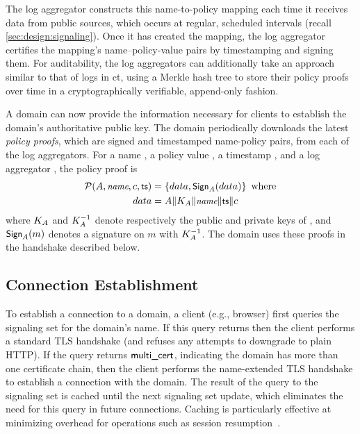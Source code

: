 The log aggregator constructs this name-to-policy mapping each time it receives
data from public sources, which 
occurs at regular, scheduled intervals (recall \autoref{sec:design:signaling}). 
Once it has created the mapping, the
log aggregator certifies the mapping's name--policy-value pairs by
timestamping and signing them. For auditability, the log aggregators
can additionally take an approach similar to that of logs in \ac{ct}, using a
Merkle hash tree to store their policy proofs over time in a cryptographically
verifiable, append-only fashion.

A domain can now provide the
information necessary for clients to establish the domain's authoritative public
key. The domain periodically downloads the latest \emph{policy proofs}, which
are signed and timestamped name-policy pairs, from each of the log aggregators.
For a name \hostname, a policy value \policy, a timestamp \timestamp, and a log
aggregator \logagg, the policy proof is 
\begin{align}
  \mathcal{P}(A, \small{\emph{name}}, c, \textsf{ts}) &= 
  \left\{data, \small{\textsf{Sign}}_{A}(data)\right\} \mbox{ where}
  \nonumber \\
  data &= A \| K_{A} \| \small{\emph{name}} \| \textsf{ts} \| c
\end{align}
where $K_{A}$ and $K_{A}^{-1}$ denote respectively the public
and private keys of \logagg, and $\small{\textsf{Sign}}_{A}(m)$ denotes a signature on $m$
with $K_{A}^{-1}$. The domain uses these proofs in the handshake described
below.

\subsection{Connection Establishment}
\label{sec:design:handshake}

To establish a connection to a domain, a client (e.g., browser) first queries
the signaling set for the domain's name. If this query returns \onecert then the
client performs a standard TLS handshake (and refuses any attempts to downgrade
to plain HTTP). If the query returns $\textsf{multi\_cert}$, indicating the domain has
more than one certificate chain, then the client performs the \ac{name}-extended
TLS handshake to establish a connection with the domain. The result of the query
to the signaling set is cached until the next signaling set update, which
eliminates the need for this query in future connections. Caching is
particularly effective at minimizing overhead for operations such as session
resumption~\cite{rfc8446}.

